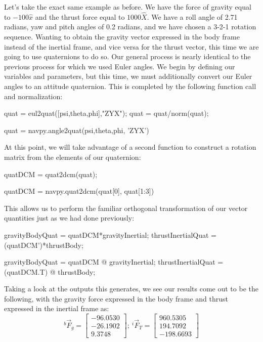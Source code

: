 \documentclass[10pt, openany, titlepage]{book}
\theoremstyle{definition}
\newcounter{example}[chapter]
\begin{document}
Let's take the exact same example as before. We have the force of gravity equal to $-100\hat{x}$ and the thrust force equal to $1000\hat{X}$. We have a roll angle of 2.71 radians, yaw and pitch angles of 0.2 radians, and we have chosen a 3-2-1 rotation sequence. Wanting to obtain the gravity vector expressed in the \gls{body frame} instead of the \gls{inertial frame}, and vice versa for the thrust vector, this time we are going to use \glspl{quaternion} to do so. Our general process is nearly identical to the previous process for which we used Euler angles. We begin by defining our variables and parameters, but this time, we must additionally convert our Euler angles to an attitude quaternion. This is completed by the following function call and normalization:
\begin{matlabscript}{}
quat = eul2quat([psi,theta,phi],"ZYX");
quat = quat/norm(quat);
\end{matlabscript}
\begin{pythonscript}{}
quat = navpy.angle2quat(psi,theta,phi, 'ZYX')
\end{pythonscript}
At this point, we will take advantage of a second function to construct a rotation matrix from the elements of our quaternion:
\begin{matlabscript}{}
quatDCM = quat2dcm(quat);
\end{matlabscript}
\begin{pythonscript}{}
quatDCM = navpy.quat2dcm(quat[0], quat[1:3])
\end{pythonscript}
This allows us to perform the familiar orthogonal transformation of our vector quantities just as we had done previously:
\begin{matlabscript}{}
gravityBodyQuat = quatDCM*gravityInertial;
thrustInertialQuat = (quatDCM')*thrustBody;
\end{matlabscript}
\begin{pythonscript}{}
gravityBodyQuat = quatDCM @ gravityInertial;
thrustInertialQuat = (quatDCM.T) @ thrustBody;
\end{pythonscript}
Taking a look at the outputs this generates, we see our results come out to be the following, with the gravity force expressed in the \gls{body frame} and thrust expressed in the \gls{inertial frame} as:
\begin{equation}
    ^b\vec{F}_{g}=\begin{bmatrix}
        -96.0530\\-26.1902\\9.3748
    \end{bmatrix};\ ^i\vec{F}_{T}=\begin{bmatrix}
        960.5305\\194.7092\\-198.6693
    \end{bmatrix}
\end{equation}
\end{document}
